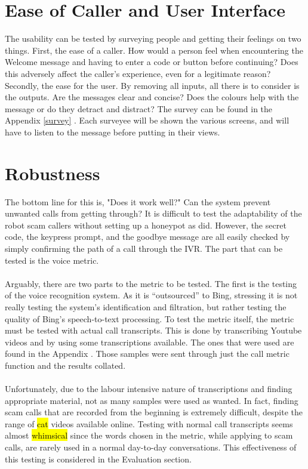 \documentclass[main.tex]{subfiles}
\begin{document}
\section{Ease of Caller and User Interface}
The usability can be tested by surveying people and getting their feelings on two things. First, the ease of a caller. How would a person feel when encountering the Welcome message and having to enter a code or button before continuing? Does this adversely affect the caller's experience, even for a legitimate reason? Secondly, the ease for the user. By removing all inputs, all there is to consider is the outputs. Are the messages clear and concise? Does the colours help with the message or do they detract and distract? The survey can be found in the Appendix \ref{survey} . Each surveyee will be shown the various screens, and will have to listen to the message before putting in their views.

\section{Robustness}
The bottom line for this is, "Does it work well?" Can the system prevent unwanted calls from getting through? It is difficult to test the adaptability of the robot scam callers without setting up a honeypot as  did. However, the secret code, the keypress prompt, and the goodbye message are all easily checked by simply confirming the path of a call through the IVR. The part that can be tested is the voice metric.
\\\\
Arguably, there are two parts to the metric to be tested. The first is the testing of the voice recognition system. As it is ``outsourced'' to Bing, stressing it is not really testing the system's identification and filtration, but rather testing the quality of Bing's speech-to-text processing. To test the metric itself, the metric must be tested with actual call transcripts. This is done by transcribing Youtube videos and by using some transcriptions available. The ones that were used are found in the Appendix . Those samples were sent through just the call metric function and the results collated.
\\\\
Unfortunately, due to the labour intensive nature of transcriptions and finding appropriate material, not as many samples were used as wanted. In fact, finding scam calls that are recorded from the beginning is extremely difficult, despite the range of \hl{cat} videos available online. Testing with normal call transcripts seems almost \hl{whimsical} since the words chosen in the metric, while applying to scam calls, are rarely used in a normal day-to-day conversations. This effectiveness of this testing is considered in the Evaluation section. 
\end{document}
